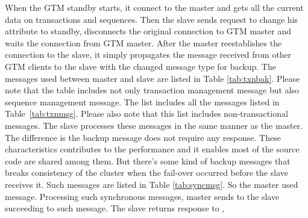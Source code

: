   When the GTM standby starts, it connect to the master and gets all the current data
  on transactions and sequences.
  Then the slave sends request to change his attribute to standby, disconnects the original connection
  to GTM master and waits the connection from GTM master.
  After the master reestablishes the connection to the slave,
  it simply propagates the message received from other GTM clients to the slave
  with the changed message type for backup.
  The messages used between master and slave are listed in Table \ref{tab:txnbak}.
  Please note that the table includes not only transaction management message but also sequence
  management message.
  The list includes all the messages listed in Table~\ref{tab:txnmsg}.
  Please also note that this list includes non-transactional messages.
  The slave processes these messages in the same manner as the master.
  The difference is the backup message does not require any response.
  These characteristics contributes to the performance and it enables most of the source code are shared among them.
  But there's some kind of backup messages that breaks consistency of the cluster when the fail-over occurred before
  the slave receives it.
  Such messages are listed in Table \ref{tab:syncmsg}.
  So the master used  message.
  Processing such synchronous messages, master sends  to the slave succeeding to such message.
  The slave returns response to , 
  
